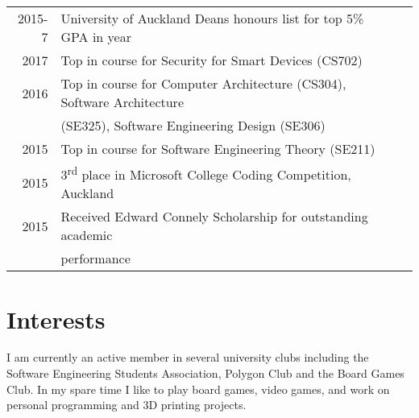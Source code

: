 \documentclass[letterpaper]{deedy-resume} %
\begin{document}
\begin{minipage}[t]{0.655\textwidth}
\begin{tabular}{rll}
2015-7	 & University of Auckland Deans honours list for top 5\% GPA in year\\
2017 	 & Top in course for Security for Smart Devices (CS702) \\
2016     & Top in course for Computer Architecture (CS304), Software Architecture\\ &(SE325), Software Engineering Design (SE306)\\
2015	 & Top in course for Software Engineering Theory (SE211)\\
2015	 & 3\textsuperscript{rd} place in Microsoft College Coding Competition, Auckland\\
2015	 & Received Edward Connely Scholarship for outstanding academic \\
		 & performance\\
\end{tabular}

\sectionspace %

\vspace{-0.5em}
\section{Interests} 

I am currently an active member in several university clubs including the Software Engineering Students Association, Polygon Club and the Board Games Club. In my spare time I like to play board games, video games, and work on personal programming and 3D printing projects.

\sectionspace %

\end{minipage} %




\end{document}
